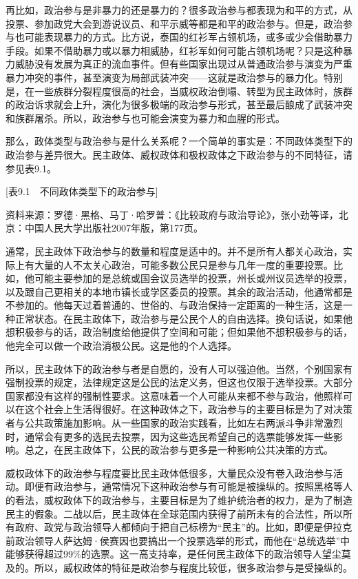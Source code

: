 再比如，政治参与是非暴力的还是暴力的？很多政治参与都表现为和平的方式，从投票、参加政党大会到游说议员、和平示威等都是和平的政治参与。但是，政治参与也可能表现暴力的方式。比方说，泰国的红衫军占领机场，或多或少会借助暴力手段。如果不借助暴力或以暴力相威胁，红衫军如何可能占领机场呢？只是这种暴力威胁没有发展为真正的流血事件。但有些国家出现过从普通政治参与演变为严重暴力冲突的事件，甚至演变为局部武装冲突——这就是政治参与的暴力化。特别是，在一些族群分裂程度很高的社会，当威权政治倒塌、转型为民主政体时，族群的政治诉求就会上升，演化为很多极端的政治参与形式，甚至最后酿成了武装冲突和族群屠杀。所以，政治参与也可能会演变为暴力和血腥的形式。


那么，政体类型与政治参与是什么关系呢？一个简单的事实是：不同政体类型下的政治参与差异很大。民主政体、威权政体和极权政体之下政治参与的不同特征，请参见表9.1。

[表9.1　不同政体类型下的政治参与]

资料来源：罗德·黑格、马丁·哈罗普：《比较政府与政治导论》，张小劲等译，北京：中国人民大学出版社2007年版，第177页。

通常，民主政体下政治参与的数量和程度是适中的。并不是所有人都关心政治，实际上有大量的人不太关心政治，可能多数公民只是参与几年一度的重要投票。比如，他可能主要参加的是总统或国会议员选举的投票，州长或州议员选举的投票，以及跟自己更相关的本地市镇长或学区委员的投票。其余的政治活动，他通常都是不参加的。他每天过着普通的、世俗的、与政治保持一定距离的一种生活，这是一种正常状态。在民主政体下，政治参与是公民个人的自由选择。换句话说，如果他想积极参与的话，政治制度给他提供了空间和可能；但如果他不想积极参与的话，他完全可以做一个政治消极公民。这是他的个人选择。

所以，民主政体下的政治参与者是自愿的，没有人可以强迫他。当然，个别国家有强制投票的规定，法律规定这是公民的法定义务，但这也仅限于选举投票。大部分国家都没有这样的强制性要求。这意味着一个人可能从来都不参与政治，他照样可以在这个社会上生活得很好。在这种政体之下，政治参与的主要目标是为了对决策者与公共政策施加影响。从一些国家的政治实践看，比如左右两派斗争非常激烈时，通常会有更多的选民去投票，因为这些选民希望自己的选票能够发挥一些影响。总之，在民主政体下，公民的政治参与更多是一种影响公共决策的方式。

威权政体下的政治参与程度要比民主政体低很多，大量民众没有卷入政治参与活动。即便有政治参与，通常情况下这种政治参与有可能是被操纵的。按照黑格等人的看法，威权政体下的政治参与，主要目标是为了维护统治者的权力，是为了制造民主的假象。二战以后，民主政体在全球范围内获得了前所未有的合法性，所以所有政府、政党与政治领导人都倾向于把自己标榜为“民主”的。比如，即便是伊拉克前政治领导人萨达姆·侯赛因也要搞出一个投票选举的形式，而他在“总统选举”中能够获得超过99\%的选票。这一高支持率，是任何民主政体下的政治领导人望尘莫及的。所以，威权政体的特征是政治参与程度比较低，很多政治参与是受操纵的。

